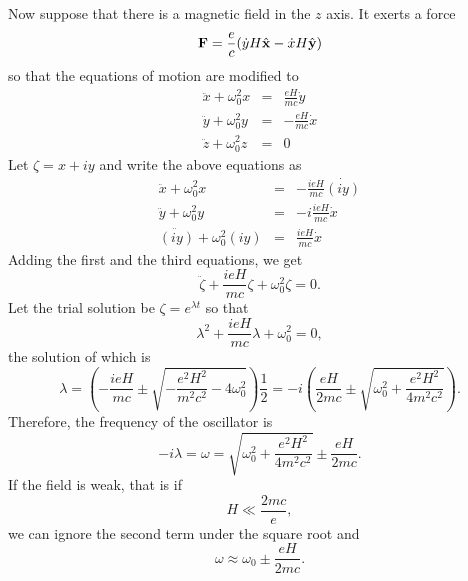 \begin{enumerate}
Now suppose that there is a magnetic field in the $z$ axis. It exerts a force
\[
\mathbf{F} = \frac{e}{c}(\dot{y} H\hat{\mathbf{x}} - \dot{x}H\hat{\mathbf{y}})
\]
so that the equations of motion are modified to
\begin{eqnarray*}
\ddot{x} + \omega_0^2 x &=& \frac{eH}{mc}\dot{y} \\
\ddot{y} + \omega_0^2 y &=& -\frac{eH}{mc}\dot{x}\\
\ddot{z} + \omega_0^2 z &=& 0
\end{eqnarray*}
Let $\zeta = x + iy$ and write the above equations as
\begin{eqnarray*}
\ddot{x} + \omega_0^2 x &=& -\frac{ieH}{mc}\dot{(iy)} \\
\ddot{y} + \omega_0^2 y &=& -i\frac{ieH}{mc}\dot{x} \\
\ddot{(iy)} + \omega_0^2 (iy) &=& \frac{ieH}{mc}\dot{x}
\end{eqnarray*}
Adding the first and the third equations, we get
\[
\ddot{\zeta} + \frac{ieH}{mc}\zeta + \omega_0^2\zeta = 0.
\]
Let the trial solution be $\zeta = e^{\lambda t}$ so that 
\[
\lambda^2 + \frac{ieH}{mc}\lambda + \omega_0^2 = 0,
\]
the solution of which is
\[
\lambda = \left(-\frac{ieH}{mc} \pm \sqrt{-\frac{e^2H^2}{m^2c^2} - 4\omega_0^2}\right)
\frac{1}{2} = -i\left(\frac{eH}{2mc} \pm \sqrt{\omega_0^2 + \frac{e^2H^2}{4m^2c^2}}\right).
\]
Therefore, the frequency of the oscillator is
\[
-i\lambda = \omega = \sqrt{\omega_0^2 + \frac{e^2H^2}{4m^2c^2}} \pm \frac{eH}{2mc}.
\]
If the field is weak, that is if
\[
H \ll \frac{2mc}{e},
\]
we can ignore the second term under the square root and
\[
\omega \approx \omega_0 \pm \frac{eH}{2mc}.
\]


\end{enumerate}
